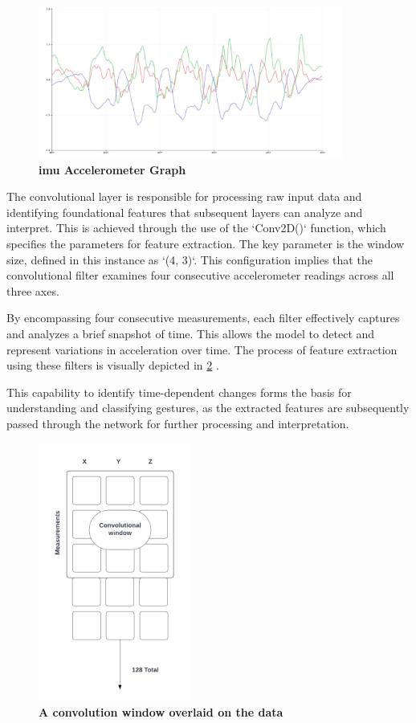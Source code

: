 \begin{figure}[H]
	\begin{center}
		
		\includegraphics[width=100mm]{Images/KDD/IMUAccelero}
		\caption{\textbf{\ac{imu} Accelerometer Graph \cite{Wings:2023}}}
		\label{fig:Accel}
		
	\end{center}
\end{figure}

The convolutional layer is responsible for processing raw input data and identifying foundational features that subsequent layers can analyze and interpret. This is achieved through the use of the `Conv2D()` function, which specifies the parameters for feature extraction. The key parameter is the window size, defined in this instance as `(4, 3)`. This configuration implies that the convolutional filter examines four consecutive accelerometer readings across all three axes.

By encompassing four consecutive measurements, each filter effectively captures and analyzes a brief snapshot of time. This allows the model to detect and represent variations in acceleration over time. The process of feature extraction using these filters is visually depicted in \ref{fig:Convolution window} \cite{Wings:2023}. 

This capability to identify time-dependent changes forms the basis for understanding and classifying gestures, as the extracted features are subsequently passed through the network for further processing and interpretation.

\begin{figure}[H]
	\includegraphics[width=50mm]{Images/KDD/Convolutionwindow}
	\caption{\textbf{A convolution window overlaid on the data}}
	\label{fig:Convolution window}
\end{figure}

